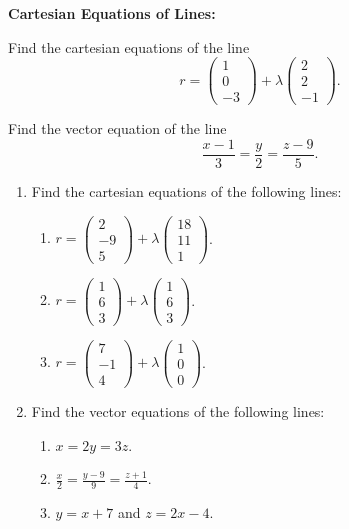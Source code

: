 \documentclass{article}
\begin{document}
\clearpage




\textbf{Cartesian Equations of Lines:}\bigskip

Find the cartesian equations of the line
\[r=\left(\begin{array}{c}1\\0\\-3\end{array}\right)+\lambda \left(\begin{array}{c}2\\2\\-1\end{array}\right).\]
\vfill

Find the vector equation of the line
\[\frac{x-1}{3}=\frac{y}{2}=\frac{z-9}{5}.\]
\vfill



\begin{enumerate}
	\item Find the cartesian equations of the following lines:
		\begin{enumerate}
			\item $r=\left(\begin{array}{c}2\\-9\\5\end{array}\right)+\lambda \left(\begin{array}{c}18\\11\\1\end{array}\right)$.
			\item $r=\left(\begin{array}{c}1\\6\\3\end{array}\right)+\lambda \left(\begin{array}{c}1\\6\\3\end{array}\right)$.
			\item $r=\left(\begin{array}{c}7\\-1\\4\end{array}\right)+\lambda \left(\begin{array}{c}1\\0\\0\end{array}\right)$.
		\end{enumerate}
	\item Find the vector equations of the following lines:
		\begin{enumerate}
			\item $x=2y=3z$.
			\item $\frac{x}{2}=\frac{y-9}{9}=\frac{z+1}{4}$.
			\item $y=x+7$ and $z=2x-4$.
		\end{enumerate}
\end{enumerate}
\end{document}
